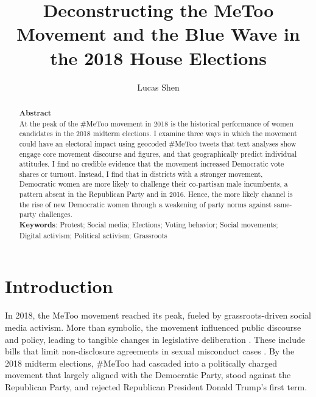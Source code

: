 \documentclass[manuscript,screen,nonacm,11pt,acm]{acmart}
\newcommand{\R}{Republican}
\begin{document}

\title{Deconstructing the MeToo Movement and the Blue Wave in the 2018 House Elections}

\author{Lucas Shen}
\authorsaddresses{}

\begin{abstract}
	\textbf{Abstract}\\
	At the peak of the \#MeToo movement in 2018 is the historical performance of women candidates in the 2018 midterm elections.
	I examine three ways in which the movement could have an electoral impact using geocoded \#MeToo tweets that text analyses show engage core movement discourse and figures, and that geographically predict individual attitudes.
	I find no credible evidence that the movement increased Democratic vote shares or turnout.
	Instead, I find that in districts with a stronger movement, Democratic women are more likely to challenge their co-partisan male incumbents, a pattern absent in the Republican Party and in 2016.
	Hence, the more likely channel is the rise of new Democratic women through a weakening of party norms against same-party challenges.\\

	\noindent
	\textbf{Keywords}:
	Protest; Social media; Elections; Voting behavior; Social movements; Digital activism; Political activism; Grassroots\\

	\noindent
\end{abstract}

\maketitle

\section{Introduction}
In 2018, the MeToo movement reached its peak, fueled by grassroots-driven social media activism.
More than symbolic, the movement influenced public discourse and policy, leading to tangible changes in legislative deliberation \citep{vox2019}.
These include bills that limit non-disclosure agreements in sexual misconduct cases \citep{Tippett2018}.
By the 2018 midterm elections, \#MeToo had cascaded into a politically charged movement that largely aligned with the Democratic Party, stood against the \R{} Party, and rejected \R{} President Donald Trump's first term.
\end{document}
